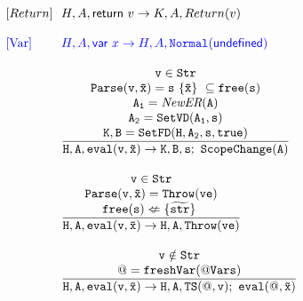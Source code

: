 \documentclass[a4paper, leqno]{amsart}
\newcommand{\jsundef}{\textsf{undefined}}
\newcommand{\jsvar}[1]{\textsf{var} \ #1}
\newcommand{\jsreturn}[1]{\textsf{return} \ #1}
\def\inblue{\color{blue}}
\newcommand{\configfromto}[6]{
	\ensuremath{#1,#2,#3 \rightarrow #4,#5,#6}
}
\begin{document}
\[
\begin{array}{l@{}l@{}ll}
[Return] & & 
\configfromto
 		{H}{A}{\jsreturn v}
		{K}{A}{Return(v)} & \\
 & & \\

\inblue\mbox{[Var]} & &
\inblue\configfromto
  {H}{A}{\jsvar{x}}
  {H}{A}{\tt Normal(\jsundef)} & \\
 & & \\
 
 & \ \ & \frac{
    \begin{matrix}
       {\tt v \in Str} \\
       {\tt Parse(v,\tilde{x}) = s \ \{\tilde{x}\} \ \subseteq free(s)} \\
       {\tt A_1 = \emph{NewER}(A)} \\
       {\tt A_2 = SetVD(A_1,s)} \\
       {\tt K,B = SetFD(H,A_2,s,true)} \\
    \end{matrix}}{
    \begin{matrix}
       {\tt H,A,eval(v,\tilde{x}) \rightarrow K,B,s;\ ScopeChange(A)}
    \end{matrix}} & \\    
 & & \\
 
 & \ \ & \frac{
    \begin{matrix}
       {\tt v \in Str} \\
       {\tt Parse(v,\tilde{x}) = Throw(ve)} \\
       {\tt free(s) \nLeftarrow \{\widetilde{str}\}}\
    \end{matrix}}{
    \begin{matrix}
       {\tt H,A,eval(v,\tilde{x}) \rightarrow H,A,Throw(ve)}
    \end{matrix}} & \\    
 & & \\
 
 & \ \ & \frac{
    \begin{matrix}
       {\tt v \notin Str} \\
       {\tt @ = freshVar(@Vars)} 
    \end{matrix}}{
    \begin{matrix}
       {\tt H,A,eval(v,\tilde{x}) \rightarrow H,A,TS(@,v);\ eval(@,\tilde{x})}
    \end{matrix}} & \\    
 & & \\


\end{array}\]
\end{document}
